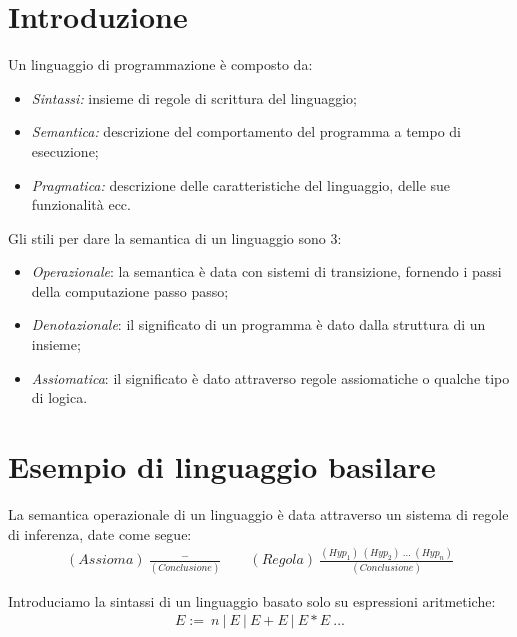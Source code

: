 \documentclass[a4paper, 11pt]{article}
\begin{document}
	\begin{frontespizio}
		\Preambolo{\usepackage{datetime}}
		\Scuola{}
	\end{frontespizio}
	
	\tableofcontents
	\newpage
	
	\section{Introduzione}
	Un linguaggio di programmazione è composto da: \begin{itemize}
		\item \textit{Sintassi:} insieme di regole di scrittura del linguaggio;
		\item \textit{Semantica:} descrizione del comportamento del programma a tempo di esecuzione;
		\item \textit{Pragmatica:} descrizione delle caratteristiche del linguaggio, delle sue funzionalità ecc.
	\end{itemize}

	Gli stili per dare la semantica di un linguaggio sono 3:
	\begin{itemize}
		\item \textit{Operazionale}: la semantica è data con sistemi di transizione, fornendo i passi della computazione passo passo;
		\item \textit{Denotazionale}: il significato di un programma è dato dalla struttura di un insieme;
		\item \textit{Assiomatica}: il significato è dato attraverso regole assiomatiche o qualche tipo di logica.
	\end{itemize}

	\section{Esempio di linguaggio basilare}
	La semantica operazionale di un linguaggio è data attraverso un sistema di regole di inferenza, date come segue: \begin{align*}
	(Assioma)\ \frac{-}{(Conclusione)} \qquad (Regola)\ \frac{(Hyp_1)\ (Hyp_2)\ ...\ (Hyp_n)}{(Conclusione)}
	\end{align*}  
	
	Introduciamo la sintassi di un linguaggio basato solo su espressioni aritmetiche:
	\begin{align*}
		E :=\ n\ |\ E\ |\ E+E\ |\ E*E\ ...
	\end{align*}
	
\end{document}
